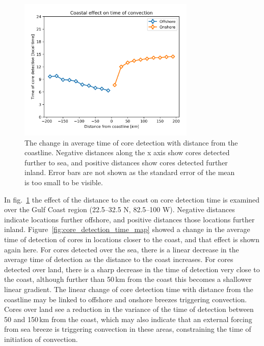 \begin{figure}[tp]
    \centering
    \includegraphics[width=0.75\textwidth]{figures/chapter2_14.png}
    \caption[
    The change in average time of core detection with distance from the coastline
    ]{
    The change in average time of core detection with distance from the coastline. Negative distances along the x axis show cores detected further to sea, and positive distances show cores detected further inland. Error bars are not shown as the standard error of the mean is too small to be visible.
    }
    \label{fig:core_coast_effect}
\end{figure}

In fig.~\ref{fig:core_coast_effect} the effect of the distance to the coast on core detection time is examined over the Gulf Coast region (22.5--32.5\,\textdegree\,N, 82.5--100\,\textdegree\,W).
Negative distances indicate locations further offshore, and positive distances those locations further inland.
Figure~\ref{fig:core_detection_time_map} showed a change in the average time of detection of cores in locations closer to the coast, and that effect is shown again here.
For cores detected over the sea, there is a linear decrease in the average time of detection as the distance to the coast increases.
For cores detected over land, there is a sharp decrease in the time of detection very close to the coast, although further than 50\,\unit{km} from the coast this becomes a shallower linear gradient.
The linear change of core detection time with distance from the coastline may be linked to offshore and onshore breezes triggering convection.
Cores over land see a reduction in the variance of the time of detection between 50 and 150\,\unit{km} from the coast, which may also indicate that an external forcing from sea breeze is triggering convection in these areas, constraining the time of initiation of convection.

